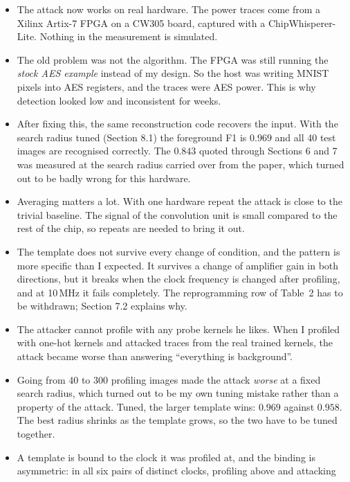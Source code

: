 \documentclass[11pt,a4paper]{article}
\begin{document}
\begin{itemize}
\item The attack now works on real hardware. The power traces come from a Xilinx
      Artix-7 FPGA on a CW305 board, captured with a ChipWhisperer-Lite. Nothing in
      the measurement is simulated.
\item The old problem was not the algorithm. The FPGA was still running the
      \emph{stock AES example} instead of my design. So the host was writing MNIST
      pixels into AES registers, and the traces were AES power. This is why detection
      looked low and inconsistent for weeks.
\item After fixing this, the same reconstruction code recovers the input. With the
      search radius tuned (Section 8.1) the foreground F1 is $0.969$ and all 40 test
      images are recognised correctly. The $0.843$ quoted through Sections 6 and 7 was
      measured at the search radius carried over from the paper, which turned out to
      be badly wrong for this hardware.
\item Averaging matters a lot. With one hardware repeat the attack is close to the
      trivial baseline. The signal of the convolution unit is small compared to the
      rest of the chip, so repeats are needed to bring it out.
\item The template does not survive every change of condition, and the pattern is more
      specific than I expected. It survives a change of amplifier gain in both
      directions, but it breaks when the clock frequency is changed after profiling, and
      at 10\,MHz it fails completely. The reprogramming row of Table~2 has to be
      withdrawn; Section 7.2 explains why.
\item The attacker cannot profile with any probe kernels he likes. When I profiled with
      one-hot kernels and attacked traces from the real trained kernels, the attack
      became worse than answering ``everything is background''.
\item Going from 40 to 300 profiling images made the attack \emph{worse} at a fixed
      search radius, which turned out to be my own tuning mistake rather than a
      property of the attack. Tuned, the larger template wins: $0.969$ against
      $0.958$. The best radius shrinks as the template grows, so the two have to be
      tuned together.
\item A template is bound to the clock it was profiled at, and the binding is
      asymmetric: in all six pairs of distinct clocks, profiling above and attacking

\end{itemize}
\end{document}
